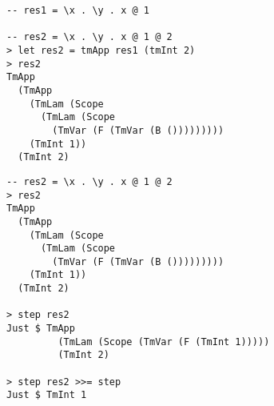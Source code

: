 \begin{frame}[fragile]
\begin{verbatim}
-- res1 = \x . \y . x @ 1

-- res2 = \x . \y . x @ 1 @ 2
> let res2 = tmApp res1 (tmInt 2)
> res2
TmApp 
  (TmApp 
    (TmLam (Scope 
      (TmLam (Scope 
        (TmVar (F (TmVar (B ())))))))) 
    (TmInt 1)) 
  (TmInt 2)
\end{verbatim}
\end{frame}

\begin{frame}[fragile]
\begin{verbatim}
-- res2 = \x . \y . x @ 1 @ 2
> res2
TmApp 
  (TmApp 
    (TmLam (Scope 
      (TmLam (Scope 
        (TmVar (F (TmVar (B ())))))))) 
    (TmInt 1)) 
  (TmInt 2)

> step res2
Just $ TmApp 
         (TmLam (Scope (TmVar (F (TmInt 1))))) 
         (TmInt 2)

> step res2 >>= step
Just $ TmInt 1
\end{verbatim}
\end{frame}
